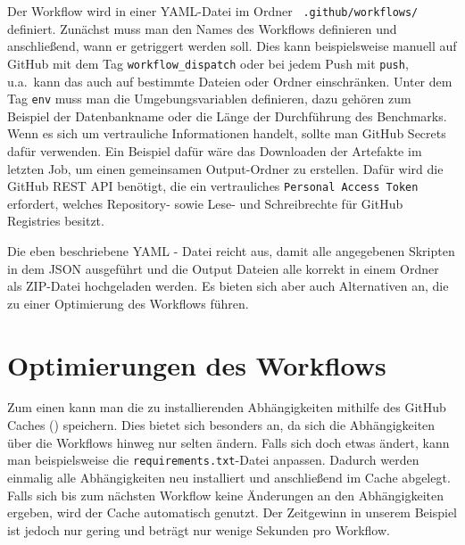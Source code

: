 Der Workflow wird in einer YAML-Datei im Ordner ~\texttt{.github/workflows/} definiert.
Zunächst muss man den Names des Workflows definieren und anschließend, wann er getriggert werden soll.
Dies kann beispielsweise manuell auf GitHub mit dem Tag \texttt{workflow\_dispatch} oder bei jedem Push mit \texttt{push}, u.a.\ kann das auch auf bestimmte Dateien oder Ordner einschränken.
Unter dem Tag \texttt{env} muss man die Umgebungsvariablen definieren, dazu gehören zum Beispiel der Datenbankname oder die Länge der Durchführung des Benchmarks.
Wenn es sich um vertrauliche Informationen handelt, sollte man GitHub Secrets dafür verwenden.
Ein Beispiel dafür wäre das Downloaden der Artefakte im letzten Job, um einen gemeinsamen Output-Ordner zu erstellen.
Dafür wird die GitHub REST API benötigt, die ein vertrauliches \texttt{Personal Access Token} erfordert, welches Repository- sowie Lese- und Schreibrechte für GitHub Registries besitzt.



Die eben beschriebene YAML - Datei reicht aus, damit alle angegebenen Skripten in dem JSON ausgeführt und die Output Dateien alle korrekt in einem Ordner als ZIP-Datei hochgeladen werden.
Es bieten sich aber auch Alternativen an, die zu einer Optimierung des Workflows führen.

\section{Optimierungen des Workflows}\label{sec:optimierungen-des-workflows}

Zum einen kann man die zu installierenden Abhängigkeiten mithilfe des GitHub Caches (\cite{github_cache_doku}) speichern.
Dies bietet sich besonders an, da sich die Abhängigkeiten über die Workflows hinweg nur selten ändern.
Falls sich doch etwas ändert, kann man beispielsweise die \texttt{require\allowbreak ments.txt}-Datei anpassen.
Dadurch werden einmalig alle Abhängigkeiten neu installiert und anschließend im Cache abgelegt.
Falls sich bis zum nächsten Workflow keine Änderungen an den Abhängigkeiten ergeben, wird der Cache automatisch genutzt.
Der Zeitgewinn in unserem Beispiel ist jedoch nur gering und beträgt nur wenige Sekunden pro Workflow.



